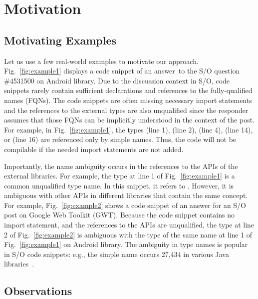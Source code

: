 \section{Motivation}
\label{motiv:sec}

\subsection{Motivating Examples}
\label{examples:sec}



Let us use a few real-world examples to motivate our approach.
Fig.~\ref{fig:example1} displays a code snippet of an answer~to the
S/O question \#4531500 on Android library. Due to the discussion
context in S/O, code snippets rarely contain sufficient declarations
and references to the fully-qualified names (FQNs). The code snippets
are often missing necessary import statements and the references to
the external types are also unqualified since the responder assumes
that those FQNs can be implicitly understood in the context of the
post. For example, in Fig.~\ref{fig:example1}, the types
 (line 1),  (line 2),  (line
4),  (line 14), or  (line 16) are referenced
only by simple names. Thus, the code will not be compilable if
the needed import statements are not added.



Importantly, the name ambiguity occurs in the references to the APIs
of the external libraries. For example, the type  at line
1 of Fig.~\ref{fig:example1} is a common unqualified type name. In
this snippet, it refers to . However, it
is ambiguous with other APIs in different libraries that contain the
same concept. For example, Fig.~\ref{fig:example2} shows a code
snippet of an answer for an S/O post on Google Web Toolkit
(GWT). Because the code snippet contains no import statement, and the
references to the APIs are unqualified, the type  at line
2 of Fig.~\ref{fig:example2} is ambiguous with the type of the same
name at line 1 of Fig.~\ref{fig:example1} on Android library. The
ambiguity in type names is popular in S/O code snippets: e.g., the
simple name  occurs 27,434 in various Java
libraries~\cite{liveapi14}.

\subsection{Observations}
\label{sec:obs}

